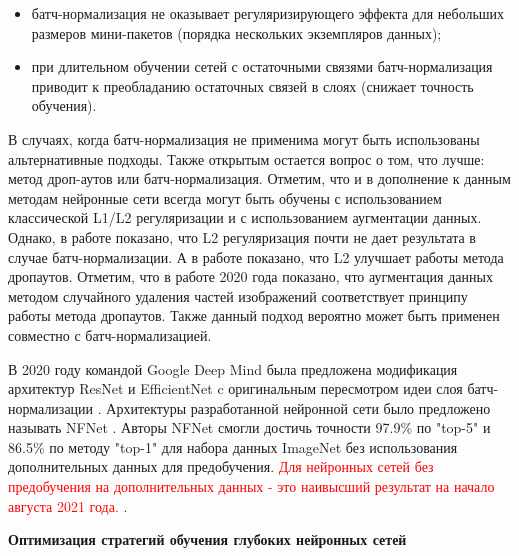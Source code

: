 \documentclass[12pt]{article}
\begin{document}
\begin{sloppypar}
\begin{itemize}
    \item батч-нормализация не оказывает регуляризирующего эффекта для небольших размеров мини-пакетов (порядка нескольких экземпляров данных);
    \item при длительном обучении сетей с остаточными связями батч-нормализация приводит к преобладанию остаточных связей в слоях (снижает точность обучения).
\end{itemize}
В случаях, когда батч-нормализация не применима могут быть использованы альтернативные подходы\cite{huang2020normalization}. Также открытым остается вопрос о том, что лучше: метод дроп-аутов или батч-нормализация. Отметим, что и в дополнение к данным методам нейронные сети всегда могут быть обучены с использованием классической L1/L2 регуляризации и с использованием аугментации данных. Однако, в работе \cite{van2017l2} показано, что L2 регуляризация почти не дает результата в случае батч-нормализации. А в работе \cite{srivastava2014dropout} показано, что L2 улучшает работы метода дропаутов. 
Отметим, что в работе 2020 года \cite{zhong2020random} показано,  что аугментация данных методом случайного удаления частей изображений соответствует принципу работы метода дропаутов. Также данный подход вероятно может быть применен совместно с батч-нормализацией. 

В 2020 году командой Google Deep Mind была предложена модификация архитектур ResNet и EfficientNet c оригинальным пересмотром идеи слоя батч-нормализации \cite{brock2021characterizing, brock2021high}. Архитектуры разработанной нейронной сети было предложено называть NFNet \cite{brock2021high}. 
Авторы NFNet смогли достичь точности 97.9\% по "top-5" и  86.5\% по методу "top-1" для набора данных ImageNet без использования дополнительных данных для предобучения. 
\textcolor{red}{
Для нейронных сетей без предобучения на дополнительных данных - это наивысший результат на начало августа 2021 года.
\cite{paperswithcodeImagenet}}.
\newline

\noindent\textbf{Оптимизация стратегий обучения глубоких нейронных сетей}


\end{sloppypar}
\end{document}
